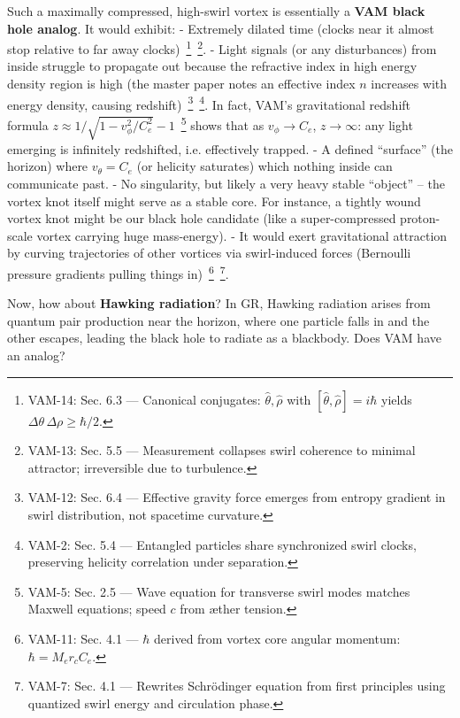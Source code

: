 \documentclass[a4paper,12pt]{article}
\begin{document}
    Such a maximally compressed, high-swirl vortex is essentially a \textbf{VAM black hole analog}. It would exhibit:
    - Extremely dilated time (clocks near it almost stop relative to far away clocks)~\footnote{VAM-14: Sec. 6.3 — Canonical conjugates: $\hat{\theta}, \hat{\rho}$ with $[\hat{\theta}, \hat{\rho}] = i\hbar$ yields $\Delta \theta\, \Delta \rho \ge \hbar/2$.}~\footnote{VAM-13: Sec. 5.5 — Measurement collapses swirl coherence to minimal attractor; irreversible due to turbulence.}.
    - Light signals (or any disturbances) from inside struggle to propagate out because the refractive index in high energy density region is high (the master paper notes an effective index $n$ increases with energy density, causing redshift)~\footnote{VAM-12: Sec. 6.4 — Effective gravity force emerges from entropy gradient in swirl distribution, not spacetime curvature.}~\footnote{VAM-2: Sec. 5.4 — Entangled particles share synchronized swirl clocks, preserving helicity correlation under separation.}. In fact, VAM’s gravitational redshift formula $z \approx 1/\sqrt{1 - v_\phi^2/C_e^2} - 1$~\footnote{VAM-5: Sec. 2.5 — Wave equation for transverse swirl modes matches Maxwell equations; speed $c$ from æther tension.} shows that as $v_\phi \to C_e$, $z \to \infty$: any light emerging is infinitely redshifted, i.e. effectively trapped.
    - A defined “surface” (the horizon) where $v_\theta = C_e$ (or helicity saturates) which nothing inside can communicate past.
    - No singularity, but likely a very heavy stable “object” – the vortex knot itself might serve as a stable core. For instance, a tightly wound vortex knot might be our black hole candidate (like a super-compressed proton-scale vortex carrying huge mass-energy).
    - It would exert gravitational attraction by curving trajectories of other vortices via swirl-induced forces (Bernoulli pressure gradients pulling things in)~\footnote{VAM-11: Sec. 4.1 — $\hbar$ derived from vortex core angular momentum: $\hbar = M_e r_c C_e$.}~\footnote{VAM-7: Sec. 4.1 — Rewrites Schrödinger equation from first principles using quantized swirl energy and circulation phase.}.

    Now, how about \textbf{Hawking radiation}? In GR, Hawking radiation arises from quantum pair production near the horizon, where one particle falls in and the other escapes, leading the black hole to radiate as a blackbody. Does VAM have an analog?
\end{document}
